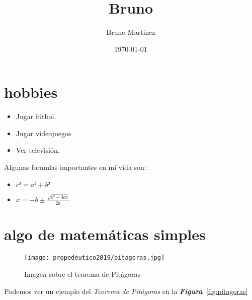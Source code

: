 \documentclass{book}
\author{Bruno Martinez}
\title{Bruno}
\date{\today}
\begin{document}
\maketitle


\section{hobbies}
\begin{itemize}
\item Jugar fútbol.
\item Jugar videojuegos
\item Ver televisión.
\end {itemize}

\newpage
Algunas formulas importantes en mi vida son:
\begin{itemize}
\item $c² = a² + b²$
\item $x=-b \pm \frac{\sqrt{b²-4ac}}{2a}$
\end{itemize}

\section{algo de matemáticas simples}
\begin{figure}[h]
  \centering
  \texttt{[image: propedeutico2019/pitagoras.jpg]}
  \caption{Imagen sobre el teorema de Pitágoras}
  \label{fig:Pitágoras}
\end{figure}

Podemos ver un ejemplo del \emph{Teorema de Pitágoras} en la \emph{\textbf{Figura}}~\ref{fig:pitagoras}
  

\end{document}
